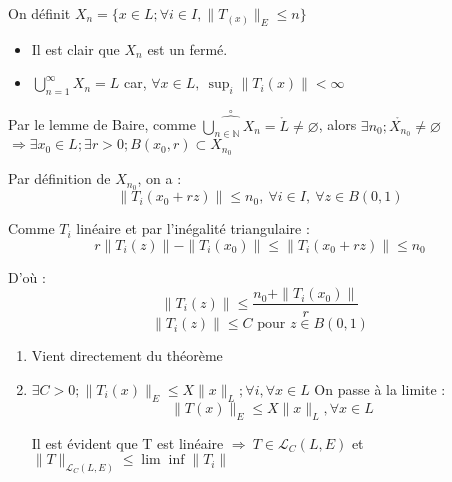 \begin{dem}
On définit $X_n=\{x\in L; \forall i\in I, \|T_(x)\|_E\leq n\}$
\begin{itemize}
	\item Il est clair que $X_n$ est un fermé.
	\item $\bigcup_{n=1}^{\infty} X_n=L$ car, $\forall x\in L,\ \sup_i \|T_i(x)\|< \infty$
\end{itemize}
Par le lemme de Baire, comme $\overset{\circ}{\widehat{\bigcup_{n\in\mathbb{N}} X_n}}=\mathring{L}\neq \varnothing$, alors $\exists n_0; \mathring{X_{n_0}}\neq \varnothing$
$\Rightarrow \exists x_0\in L; \exists r>0; B(x_0,r)\subset X_{n_0}$

Par définition de $X_{n_0}$, on a :
\[\|T_i(x_0+rz)\|\leq n_0,\ \forall i\in I,\ \forall z\in B(0,1)\]

Comme $T_i$ linéaire et par l'inégalité triangulaire :
\[r\|T_i(z)\|-\|T_i(x_0)\|\leq \|T_i(x_0+rz)\|\leq n_0\]

D'où :
\[\|T_i(z)\|\leq \frac{n_0+\|T_i(x_0)\|}{r}\]
\[\|T_i(z)\|\leq C \text{ pour } z\in B(0,1)\]
\end{dem}


\begin{dem}
\begin{enumerate}
\item Vient directement du théorème
\item $\exists C>0; \|T_i(x)\|_E\leq X\|x\|_L; \forall i, \forall x\in L$
On passe à la limite :
\[\|T(x)\|_E\leq X\|x\|_L, \forall x\in L\]

Il est évident que T est linéaire $\Rightarrow\ T\in \mathcal{L}_C(L,E)$ et $\|T\|_{\mathcal{L}_C(L,E)}\leq \lim \inf \|T_i\|$
\end{enumerate}
\end{dem}


